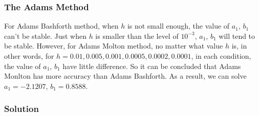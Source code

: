 \documentclass[a4paper]{article}
\begin{document}
	\subsubsection{The Adams Method}
	
	For Adams Bashforth method, when $h$ is not small enough, the value of $a_1$, $b_1$ can’t be stable. Just when $h$ is smaller than the level of $10^{-3}$, $a_1$, $b_1$ will tend to be stable. However, for Adams Molton method, no matter what value $h$ is, in other words, for $h=0.01,0.005,0.001,0.0005,0.0002,0.0001$, in each condition, the value of $a_1$, $b_1$ have little difference. So it can be concluded that Adams Monlton has more accuracy than Adams Bashforth. As a result, we can solve $a_1=-2.1207$, $b_1=0.8588$.
	
	\begin{table}[H]
		\centering
		\caption{Using Adams Method to Determine t When y is infinity}
		\label{tab:adams_inf}
	\end{table}

	\subsubsection{Solution}
	
\end{document}
